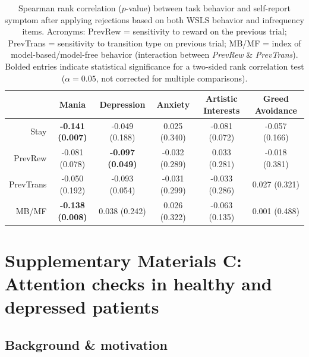 \documentclass[a4paper,notitlepage,12pt]{article}
\begin{document}
\begin{table}[H]
    \centering
    \begin{adjustbox}{center}   
    \small
    \begin{tabular}{rccccc}
        \toprule
        {} & Mania & Depression & Anxiety & Artistic Interests & Greed Avoidance \\
        \midrule
        Stay      &  \textbf{-0.141 (0.007)} &           -0.049 (0.188) &   0.025 (0.340) &  -0.081 (0.072) &  -0.057 (0.166) \\
        PrevRew   &           -0.081 (0.078) &  \textbf{-0.097 (0.049)} &  -0.032 (0.289) &   0.033 (0.281) &  -0.018 (0.381) \\
        PrevTrans &           -0.050 (0.192) &           -0.093 (0.054) &  -0.031 (0.299) &  -0.033 (0.286) &   0.027 (0.321) \\
        MB/MF     &  \textbf{-0.138 (0.008)} &            0.038 (0.242) &   0.026 (0.322) &  -0.063 (0.135) &   0.001 (0.488) \\
        \bottomrule
    \end{tabular}
    \end{adjustbox}
    \caption{Spearman rank correlation ($p$-value) between task behavior and self-report symptom after applying rejections based on both WSLS behavior and infrequency items. Acronyms: PrevRew = sensitivity to reward on the previous trial; PrevTrans = sensitivity to transition type on previous trial; MB/MF = index of model-based/model-free behavior (interaction between \textit{PrevRew} \& \textit{PrevTrans}). Bolded entries indicate statistical significance for a two-sided rank correlation test ($\alpha = 0.05$, not corrected for multiple comparisons).}
\end{table}

\break
{}
\section*{Supplementary Materials C: Attention checks in healthy and depressed patients}

\subsection*{Background \& motivation}
\end{document}
